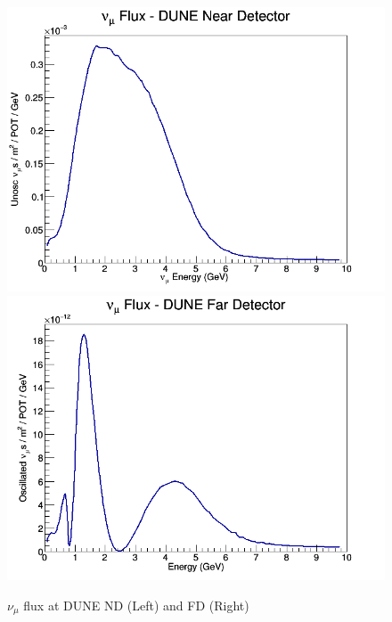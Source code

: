 \documentclass[12pt]{article}
\begin{document}
\begin{figure}[h]
\centering
{}
\includegraphics[width=\linewidth]{Dune_Flux/numu_ND_flux.png}
\endminipage
{}
\includegraphics[width=\linewidth]{Dune_Flux/numu_FD_flux.png}
\endminipage
\caption{$\nu_\mu$ flux at DUNE ND (Left) and FD (Right)}
\label{fig:dune_flux}
\end{figure}
\end{document}
